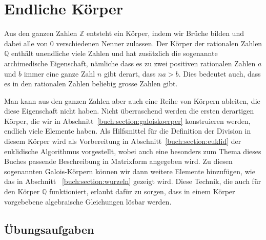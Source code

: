 %
%
%
\chapter{Endliche Körper
\label{buch:chapter:endliche-koerper}}
\rhead{}
Aus den ganzen Zahlen $\mathbb{Z}$ entsteht ein Körper, indem wir Brüche
bilden und dabei alle von $0$ verschiedenen Nenner zulassen.
Der Körper der rationalen Zahlen $\mathbb{Q}$ enthält unendliche
viele Zahlen und hat zusätzlich die sogenannte archimedische Eigenschaft,
nämliche dass es zu zwei positiven rationalen Zahlen $a$ und $b$ immer eine
ganze Zahl $n$ gibt derart, dass $na>b$.
Dies bedeutet auch, dass es in den rationalen Zahlen beliebig grosse Zahlen
gibt.

Man kann aus den ganzen Zahlen aber auch eine Reihe von Körpern ableiten,
die diese Eigenschaft nicht haben.
Nicht überraschend werden die ersten derartigen Körper, die wir
in Abschnitt~\ref{buch:section:galoiskoerper} konstruieren werden,
endlich viele Elemente haben.
Als Hilfsmittel für die Definition der Division in diesem Körper wird
als Vorbereitung in Abschnitt~\ref{buch:section:euklid} der
euklidische Algorithmus vorgestellt, wobei auch eine besonders zum
Thema dieses Buches passende Beschreibung in Matrixform angegeben wird.
Zu diesen sogenannten Galois-Körpern können wir dann weitere Elemente
hinzufügen, wie das in Abschnitt ~\ref{buch:section:wurzeln} 
gezeigt wird.
Diese Technik, die auch für den Körper $\mathbb{Q}$ funktioniert, erlaubt
dafür zu sorgen, dass in einem Körper vorgebebene algebraische Gleichungen
lösbar werden.






\section*{Übungsaufgaben}
\begin{uebungsaufgaben}
\end{uebungsaufgaben}

